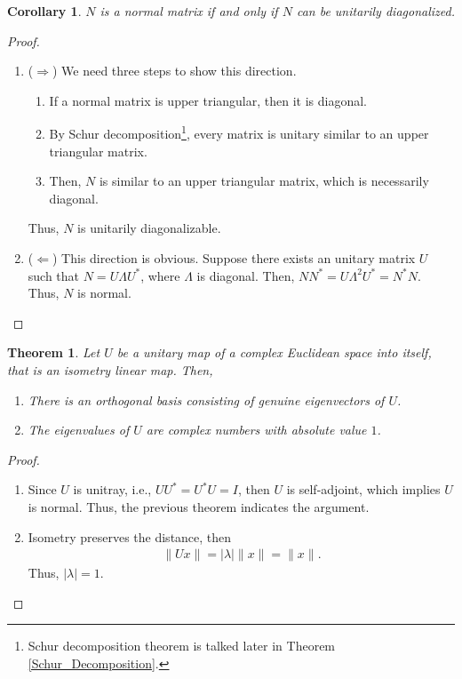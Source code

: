 \documentclass[11pt]{book}
\newtheorem{theorem}{Theorem}[section]
\newtheorem{corollary}{Corollary}[theorem]
\theoremstyle{definition}
\numberwithin{equation}{chapter}
\begin{document}
\begin{corollary}\label{normal_matrix_unitary_diagonal}
$N$ is a normal matrix if and only if $N$ can be unitarily diagonalized.
\end{corollary}
\begin{proof}
~\begin{enumerate}[label=(\arabic*)]
    \item ($\Rightarrow$) We need three steps to show this direction\cite{25}.
    \begin{enumerate}[label=\alph*)]
        \item If a normal matrix is upper triangular, then it is diagonal.
        
        \item By Schur decomposition\footnote{Schur decomposition theorem is talked later in Theorem \ref{Schur_Decomposition}.}, every matrix is unitary similar to an upper triangular matrix.
        
        \item Then, $N$ is similar to an upper triangular matrix, which is necessarily diagonal.
    \end{enumerate}
    Thus, $N$ is unitarily diagonalizable. 
    
    \item ($\Leftarrow$) This direction is obvious. Suppose there exists an unitary matrix $U$ such that $N = U \Lambda U^*$, where $\Lambda$ is diagonal. Then, $N N^* = U \Lambda^2 U^* = N^* N$. Thus, $N$ is normal.
\end{enumerate}
\end{proof}

\medskip

\begin{theorem}\label{isometry_property}
Let $U$ be a unitary map of a complex Euclidean space into itself, that is an isometry linear map. Then,
\begin{enumerate}[label=(\alph*)]
    \item There is an orthogonal basis consisting of genuine eigenvectors of $U$.
    \item The eigenvalues of $U$ are complex numbers with absolute value $1$.
\end{enumerate}
\end{theorem}
\begin{proof}
~\begin{enumerate}[label=(\alph*)]
    \item Since $U$ is unitray, i.e., $UU^* = U^*U = I$, then $U$ is self-adjoint, which implies $U$ is normal. Thus,  the previous theorem indicates the argument.
    \item Isometry preserves the distance, then 
    \begin{align*}
        \|Ux\| = |\lambda| \|x\| = \|x\|.
    \end{align*}
    Thus, $|\lambda| = 1$.
\end{enumerate}
\end{proof}
\end{document}
